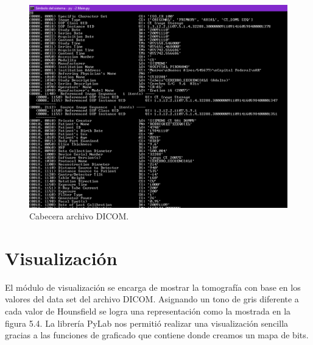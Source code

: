 \documentclass[12pt]{report}
\begin{document}
\begin{figure}[H]
\centering
\includegraphics[width = 12 cm, height = 18 cm]{cabecera}
\caption{Cabecera archivo DICOM.}
\end{figure}

\section{Visualización}
El módulo de visualización se encarga de mostrar la tomografía con base en los valores del data set del archivo DICOM. Asignando un tono de gris diferente a cada valor de Hounsfield se logra una representación como la mostrada en la figura 5.4. La librería PyLab nos permitió realizar una visualización sencilla gracias a las funciones de graficado que contiene donde creamos un mapa de bits.
\end{document}
